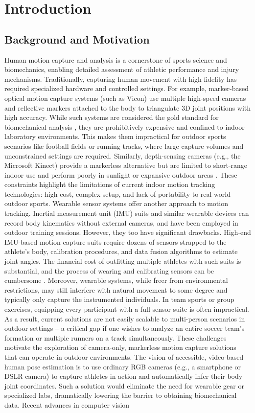 \section{Introduction} \subsection{Background and Motivation}
Human motion capture and analysis is a cornerstone of sports science and biomechanics, enabling detailed assessment of athletic performance and injury mechanisms. Traditionally, capturing human movement with high fidelity has required specialized hardware and controlled settings. For example, marker-based optical motion capture systems (such as Vicon) use multiple high-speed cameras and reflective markers attached to the body to triangulate 3D joint positions with high accuracy. While such systems are considered the gold standard for biomechanical analysis \cite{OpticalMocapLimit}, they are prohibitively expensive and confined to indoor laboratory environments. This makes them impractical for outdoor sports scenarios like football fields or running tracks, where large capture volumes and unconstrained settings are required. Similarly, depth-sensing cameras (e.g., the Microsoft Kinect) provide a markerless alternative but are limited to short-range indoor use and perform poorly in sunlight or expansive outdoor areas \cite{KinectLimit}. These constraints highlight the limitations of current indoor motion tracking technologies: high cost, complex setup, and lack of portability to real-world outdoor sports. Wearable sensor systems offer another approach to motion tracking. Inertial measurement unit (IMU) suits and similar wearable devices can record body kinematics without external cameras, and have been employed in outdoor training sessions. However, they too have significant drawbacks. High-end IMU-based motion capture suits require dozens of sensors strapped to the athlete’s body, calibration procedures, and data fusion algorithms to estimate joint angles. The financial cost of outfitting multiple athletes with such suits is substantial, and the process of wearing and calibrating sensors can be cumbersome \cite{Rekant2021}. Moreover, wearable systems, while freer from environmental restrictions, may still interfere with natural movement to some degree and typically only capture the instrumented individuals. In team sports or group exercises, equipping every participant with a full sensor suite is often impractical. As a result, current solutions are not easily scalable to multi-person scenarios in outdoor settings – a critical gap if one wishes to analyze an entire soccer team’s formation or multiple runners on a track simultaneously. These challenges motivate the exploration of camera-only, markerless motion capture solutions that can operate in outdoor environments. The vision of accessible, video-based human pose estimation is to use ordinary RGB cameras (e.g., a smartphone or DSLR camera) to capture athletes in action and automatically infer their body joint coordinates. Such a solution would eliminate the need for wearable gear or specialized labs, dramatically lowering the barrier to obtaining biomechanical data. Recent advances in computer vision 